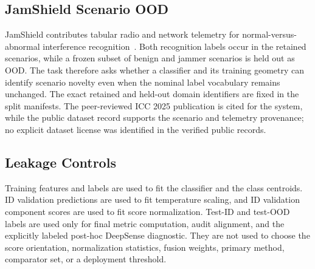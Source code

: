 \subsection{JamShield Scenario OOD}

JamShield contributes tabular radio and network telemetry for normal-versus-abnormal interference recognition~\cite{panitsas2025jamshield,panitsas2024jamshielddataset}. Both recognition labels occur in the retained scenarios, while a frozen subset of benign and jammer scenarios is held out as OOD. The task therefore asks whether a classifier and its training geometry can identify scenario novelty even when the nominal label vocabulary remains unchanged. The exact retained and held-out domain identifiers are fixed in the split manifests. The peer-reviewed ICC 2025 publication is cited for the system, while the public dataset record supports the scenario and telemetry provenance; no explicit dataset license was identified in the verified public records.

\subsection{Leakage Controls}

Training features and labels are used to fit the classifier and the class centroids. ID validation predictions are used to fit temperature scaling, and ID validation component scores are used to fit score normalization. Test-ID and test-OOD labels are used only for final metric computation, audit alignment, and the explicitly labeled post-hoc DeepSense diagnostic. They are not used to choose the score orientation, normalization statistics, fusion weights, primary method, comparator set, or a deployment threshold.
